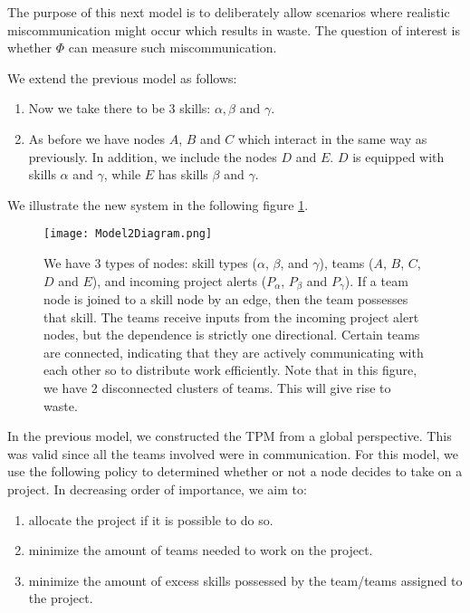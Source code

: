 The purpose of this next model is to deliberately allow scenarios where realistic miscommunication might occur which results in waste. The question of interest is whether $\Phi$ can measure such miscommunication.

We extend the previous model as follows: 
\begin{enumerate}
	\item Now we take there to be 3 skills: $\alpha, \beta$ and $\gamma$.
	
	\item As before we have nodes $A$, $B$ and $C$ which interact in the same way as previously. In addition, we include the nodes $D$ and $E$. $D$ is equipped with skills $\alpha$ and $\gamma$, while $E$ has skills $\beta$ and $\gamma$. 
\end{enumerate}

We illustrate the new system in the following figure \ref{fig:diagram2}.
\begin{figure}[ht]
	\centering	
	\texttt{[image: Model2Diagram.png]}
	\caption{We have 3 types of nodes: skill types ($\alpha$, $\beta$, and $\gamma$), teams ($A$, $B$, $C$, $D$ and $E$), and incoming project alerts ($P_\alpha$, $P_\beta$ and $P_\gamma$). If a team node is joined to a skill node by an edge, then the team possesses that skill. The teams receive inputs from the incoming project alert nodes, but the dependence is strictly one directional.
	Certain teams are connected, indicating that they are actively communicating with each other so to distribute work efficiently. Note that in this figure, we have 2 disconnected clusters of teams. This will give rise to waste.}
	\label{fig:diagram2}
\end{figure}

In the previous model, we constructed the TPM from a global perspective. This was valid since all the teams involved were in communication. For this model, we use the following policy to determined whether or not a node decides  to take on a project. In decreasing order of importance, we aim to:


\begin{enumerate}
	\item allocate the project if it is possible to do so.
	\item minimize the amount of teams needed to work on the project.
	\item minimize the amount of excess skills possessed by the team/teams assigned to the project.
\end{enumerate}

